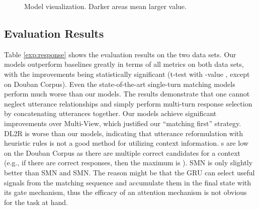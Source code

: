 \documentclass[11pt,a4paper]{article}
\begin{document}
	\begin{figure*}[!h]\vspace{-2mm}
		\centering
\vspace{-4mm}
		\caption{Model visualization. Darker areas mean larger value.}
		\label{fig:compareall} \vspace{-4mm}
	\end{figure*}
	\vspace{-2mm}
	
	\subsection{Evaluation Results}
	Table \ref{exp:response} shows the evaluation results on the two data sets.  Our models outperform baselines greatly in terms of all metrics on both data sets, with the improvements being statistically significant (t-test with -value , except  on Douban Corpus). Even the state-of-the-art single-turn matching models perform much worse than our models. The results demonstrate that one cannot neglect utterance relationships and simply perform multi-turn response selection by concatenating utterances together. Our models achieve significant improvements over Multi-View, which justified our ``matching first'' strategy.  DL2R is worse than our models, indicating that utterance reformulation with heuristic rules is not a good method for utilizing context information. s are low on the Douban Corpus as there are multiple correct candidates for a context (e.g., if there are  correct responses, then the maximum  is ). 
	SMN is only slightly better than  SMN and SMN. The reason might be that the GRU can select useful signals from the matching sequence and accumulate them in the final state with its gate mechanism, thus the efficacy of an attention mechanism is not obvious for the task at hand.
	\vspace{-2mm} 	
\end{document}
